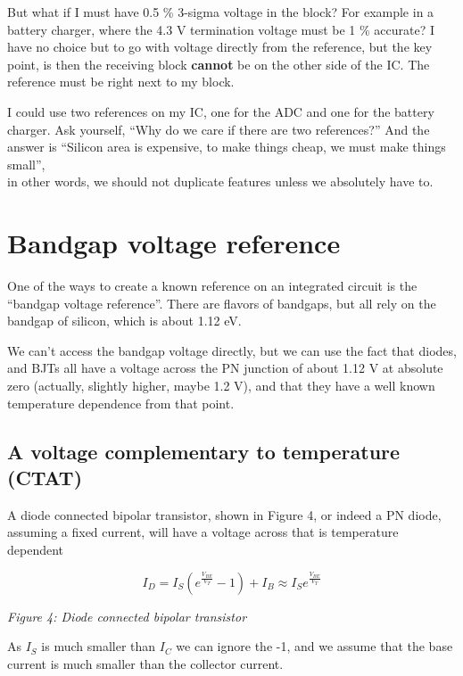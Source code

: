 But what if I must have 0.5 \% 3-sigma voltage in the block? For example
in a battery charger, where the 4.3 V termination voltage must be 1 \%
accurate? I have no choice but to go with voltage directly from the
reference, but the key point, is then the receiving block
\textbf{cannot} be on the other side of the IC. The reference must be
right next to my block.

I could use two references on my IC, one for the ADC and one for the
battery charger. Ask yourself, ``Why do we care if there are two
references?'' And the answer is ``Silicon area is expensive, to make
things cheap, we must make things small'',\\
in other words, we should not duplicate features unless we absolutely
have to.

\section{Bandgap voltage reference}\label{bandgap-voltage-reference}

One of the ways to create a known reference on an integrated circuit is
the ``bandgap voltage reference''. There are flavors of bandgaps, but
all rely on the bandgap of silicon, which is about 1.12 eV.

We can't access the bandgap voltage directly, but we can use the fact
that diodes, and BJTs all have a voltage across the PN junction of about
1.12 V at absolute zero (actually, slightly higher, maybe 1.2 V), and
that they have a well known temperature dependence from that point.

\subsection{A voltage complementary to temperature
(CTAT)}\label{a-voltage-complementary-to-temperature-ctat}

A diode connected bipolar transistor, shown in Figure 4, or indeed a PN
diode, assuming a fixed current, will have a voltage across that is
temperature dependent

\[ I_D = I_S \left(e^{\frac{V_{BE}}{V_T}} - 1\right)  + I_B \approx I_S e^{\frac{ V_{BE}}{V_T}}\]


{
\centering
{}
}

\emph{Figure 4: Diode connected bipolar transistor }

As \(I_S\) is much smaller than \(I_C\) we can ignore the -1, and we
assume that the base current is much smaller than the collector current.

